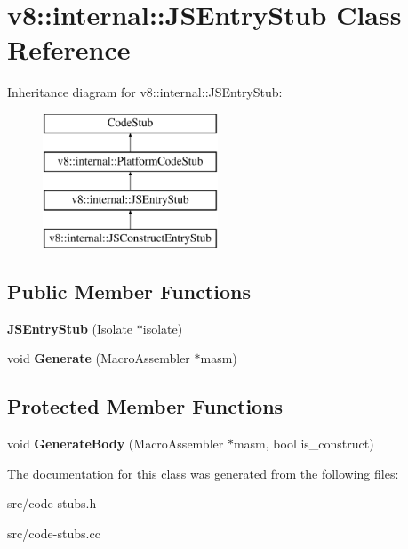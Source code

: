 \hypertarget{classv8_1_1internal_1_1_j_s_entry_stub}{}\section{v8\+:\+:internal\+:\+:J\+S\+Entry\+Stub Class Reference}
\label{classv8_1_1internal_1_1_j_s_entry_stub}
Inheritance diagram for v8\+:\+:internal\+:\+:J\+S\+Entry\+Stub\+:\begin{figure}[H]
\begin{center}
\leavevmode
\includegraphics[height=4.000000cm]{classv8_1_1internal_1_1_j_s_entry_stub}
\end{center}
\end{figure}
\subsection*{Public Member Functions}
\begin{DoxyCompactItemize}
\item 
\hypertarget{classv8_1_1internal_1_1_j_s_entry_stub_a7bb8fd31e66df17cf0494793e2bd121e}{}{\bfseries J\+S\+Entry\+Stub} (\hyperlink{classv8_1_1internal_1_1_isolate}{Isolate} $\ast$isolate)\label{classv8_1_1internal_1_1_j_s_entry_stub_a7bb8fd31e66df17cf0494793e2bd121e}

\item 
\hypertarget{classv8_1_1internal_1_1_j_s_entry_stub_acba204902b6db453d4b0510a976ebcd0}{}void {\bfseries Generate} (Macro\+Assembler $\ast$masm)\label{classv8_1_1internal_1_1_j_s_entry_stub_acba204902b6db453d4b0510a976ebcd0}

\end{DoxyCompactItemize}
\subsection*{Protected Member Functions}
\begin{DoxyCompactItemize}
\item 
\hypertarget{classv8_1_1internal_1_1_j_s_entry_stub_a83d3bab8ea5d03f8bf6e318ffac5dbd1}{}void {\bfseries Generate\+Body} (Macro\+Assembler $\ast$masm, bool is\+\_\+construct)\label{classv8_1_1internal_1_1_j_s_entry_stub_a83d3bab8ea5d03f8bf6e318ffac5dbd1}

\end{DoxyCompactItemize}


The documentation for this class was generated from the following files\+:\begin{DoxyCompactItemize}
\item 
src/code-\/stubs.\+h\item 
src/code-\/stubs.\+cc\end{DoxyCompactItemize}
